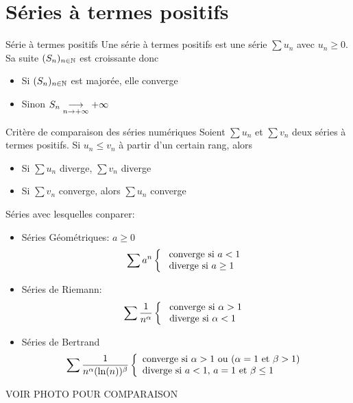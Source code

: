 \documentclass[]{report}
\begin{document}
\section{Séries à termes positifs}

\begin{df}{Série à termes positifs}{}
    Une série à termes positifs est une série $\sum u_n$ avec $u_n \ge 0$. Sa suite $(S_n)_{n\in\mathbb{N}}$ est croissante donc
    \begin{itemize}
        \item Si $(S_n)_{n\in\mathbb{N}}$ est majorée, elle converge
        \item Sinon $S_n\underset{n\to +\infty}{\longrightarrow} +\infty$
    \end{itemize}
\end{df}

\begin{prop}{Critère de comparaison des séries numériques}{}
    Soient $\sum u_n$ et $\sum v_n$ deux séries à termes positifs. Si $u_n\le v_n$ à partir d'un certain rang, alors
    \begin{itemize}
        \item Si $\sum u_n$ diverge, $\sum v_n$ diverge
        \item Si $\sum v_n$ converge, alors $\sum u_n$ converge
    \end{itemize}
    Séries avec lesquelles conparer:
    \begin{itemize}
        \item Séries Géométriques: $a\ge 0$
              \[\sum a^n \left\{\begin{array}{ll} \text{ converge si }a<1\\ \text{ diverge si }a \ge 1 \end{array} \right.\]
        \item Séries de Riemann:
              \[\sum \frac{1}{n^{\alpha}}\left\{\begin{array}{ll} \text{ converge si }\alpha>1\\ \text{ diverge si }\alpha < 1 \end{array} \right.\]
        \item Séries de Bertrand
              \[\sum \frac{1}{n^\alpha (\ln (n))^\beta}\left\{\begin{array}{ll} \text{converge si }\alpha>1 \text{ ou }(\alpha=1 \text{ et } \beta >1)\\ \text{diverge si $a<1$, $a=1$ et $\beta \le 1$} \end{array} \right.\]
    \end{itemize}
    VOIR PHOTO POUR COMPARAISON
\end{prop}
\end{document}
